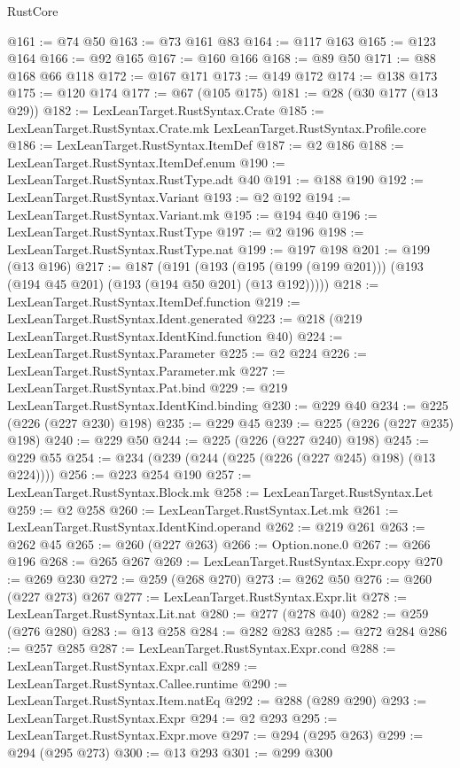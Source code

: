 \begin{lexlean}{RustCore}
\begin{coremodule}
@161 := @74 @50
@163 := @73 @161 @83
@164 := @117 @163
@165 := @123 @164
@166 := @92 @165
@167 := @160 @166
@168 := @89 @50
@171 := @88 @168 @66 @118
@172 := @167 @171
@173 := @149 @172
@174 := @138 @173
@175 := @120 @174
@177 := @67 (@105 @175)
@181 := @28 (@30 @177 (@13 @29))
@182 := LexLeanTarget.RustSyntax.Crate
@185 := LexLeanTarget.RustSyntax.Crate.mk LexLeanTarget.RustSyntax.Profile.core
@186 := LexLeanTarget.RustSyntax.ItemDef
@187 := @2 @186
@188 := LexLeanTarget.RustSyntax.ItemDef.enum
@190 := LexLeanTarget.RustSyntax.RustType.adt @40
@191 := @188 @190
@192 := LexLeanTarget.RustSyntax.Variant
@193 := @2 @192
@194 := LexLeanTarget.RustSyntax.Variant.mk
@195 := @194 @40
@196 := LexLeanTarget.RustSyntax.RustType
@197 := @2 @196
@198 := LexLeanTarget.RustSyntax.RustType.nat
@199 := @197 @198
@201 := @199 (@13 @196)
@217 := @187
    (@191 (@193 (@195 (@199 (@199 @201))) (@193 (@194 @45 @201) (@193 (@194 @50 @201) (@13 @192)))))
@218 := LexLeanTarget.RustSyntax.ItemDef.function
@219 := LexLeanTarget.RustSyntax.Ident.generated
@223 := @218 (@219 LexLeanTarget.RustSyntax.IdentKind.function @40)
@224 := LexLeanTarget.RustSyntax.Parameter
@225 := @2 @224
@226 := LexLeanTarget.RustSyntax.Parameter.mk
@227 := LexLeanTarget.RustSyntax.Pat.bind
@229 := @219 LexLeanTarget.RustSyntax.IdentKind.binding
@230 := @229 @40
@234 := @225 (@226 (@227 @230) @198)
@235 := @229 @45
@239 := @225 (@226 (@227 @235) @198)
@240 := @229 @50
@244 := @225 (@226 (@227 @240) @198)
@245 := @229 @55
@254 := @234 (@239 (@244 (@225 (@226 (@227 @245) @198) (@13 @224))))
@256 := @223 @254 @190
@257 := LexLeanTarget.RustSyntax.Block.mk
@258 := LexLeanTarget.RustSyntax.Let
@259 := @2 @258
@260 := LexLeanTarget.RustSyntax.Let.mk
@261 := LexLeanTarget.RustSyntax.IdentKind.operand
@262 := @219 @261
@263 := @262 @45
@265 := @260 (@227 @263)
@266 := Option.none.{0}
@267 := @266 @196
@268 := @265 @267
@269 := LexLeanTarget.RustSyntax.Expr.copy
@270 := @269 @230
@272 := @259 (@268 @270)
@273 := @262 @50
@276 := @260 (@227 @273) @267
@277 := LexLeanTarget.RustSyntax.Expr.lit
@278 := LexLeanTarget.RustSyntax.Lit.nat
@280 := @277 (@278 @40)
@282 := @259 (@276 @280)
@283 := @13 @258
@284 := @282 @283
@285 := @272 @284
@286 := @257 @285
@287 := LexLeanTarget.RustSyntax.Expr.cond
@288 := LexLeanTarget.RustSyntax.Expr.call
@289 := LexLeanTarget.RustSyntax.Callee.runtime
@290 := LexLeanTarget.RustSyntax.Item.natEq
@292 := @288 (@289 @290)
@293 := LexLeanTarget.RustSyntax.Expr
@294 := @2 @293
@295 := LexLeanTarget.RustSyntax.Expr.move
@297 := @294 (@295 @263)
@299 := @294 (@295 @273)
@300 := @13 @293
@301 := @299 @300

\end{coremodule}
\end{lexlean}
